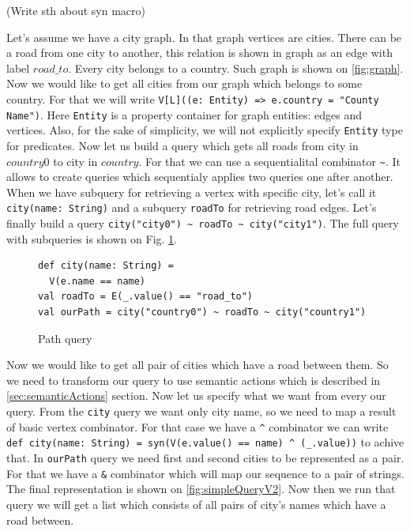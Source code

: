 (Write sth about syn macro)

Let's assume we have a city graph. In that graph vertices are cities. There can be a road from one city to another, this relation is shown in graph as an edge with label $road\_to$. Every city belongs to a country. Such graph is shown on \ref{fig:graph}. Now we would like to get all cities from our graph which belongs to some country. For that we will write \lstinline{V[L]((e: Entity) => e.country = "County Name")}. Here \lstinline{Entity} is a property container for graph entities: edges and vertices. Also, for the sake of simplicity, we will not explicitly specify \lstinline{Entity} type for predicates. Now let us build a query which gets all roads from city in $country0$ to city in $country$. For that we can use a sequentialital combinator \lstinline{~}. It allows to create queries which sequentialy applies two queries one after another. When we have subquery for retrieving a vertex with specific city, let's call it \lstinline{city(name: String)} and a subquery \lstinline{roadTo} for retrieving road edges. Let's finally build a query \lstinline{city("city0") ~ roadTo ~ city("city1")}. The full query with subqueries is shown on Fig. \ref{fig:simpleQuery}.

\begin{figure}[h]
\begin{lstlisting}
def city(name: String) =
  V(e.name == name)
val roadTo = E(_.value() == "road_to")
val ourPath = city("country0") ~ roadTo ~ city("country1")
\end{lstlisting}
\caption{Path query}
\label{fig:simpleQuery}
\end{figure}



Now we would like to get all pair of cities which have a road between them. So we need to transform our query to use semantic actions which is described in \ref{sec:semanticActions} section. Now let us specify what we want from every our query. From the \lstinline{city} query we want only city name, so we need to map a result of basic vertex combinator. For that case we have a \lstinline{^} combinator we can write \lstinline{def city(name: String) = syn(V(e.value() == name) ^ (_.value))} to achive that. In \lstinline{ourPath} query we need first and second cities to be represented as a pair. For that we have a \lstinline{&} combinator which will map our sequence to a pair of strings. The final representation is shown on \ref{fig:simpleQueryV2}. Now then we run that query we will get a list which consists of all pairs of city's names which have a road between.

